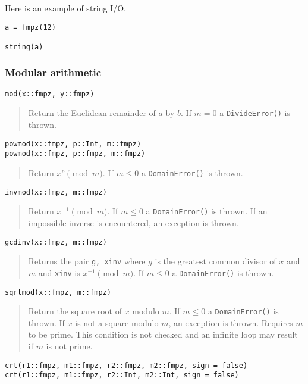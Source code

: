 \documentclass[a4paper,10pt]{article}
\newcommand{\code}{\lstinline}
\newcommand{\desc}[1]{\vspace{-3mm}\begin{quote}#1\end{quote}}
\begin{document}
{{Here is an example of string I/O.

\begin{lstlisting}
a = fmpz(12)

string(a)
\end{lstlisting}

\subsubsection{Modular arithmetic}

\begin{lstlisting}
mod(x::fmpz, y::fmpz)
\end{lstlisting}

\desc{Return the Euclidean remainder of $a$ by $b$. If $m = 0$ a \code{DivideError()} is thrown.}

\begin{lstlisting}
powmod(x::fmpz, p::Int, m::fmpz)
powmod(x::fmpz, p::fmpz, m::fmpz)
\end{lstlisting}

\desc{Return $x^p \pmod{m}$. If $m \leq 0$ a \code{DomainError()} is thrown.}

\begin{lstlisting}
invmod(x::fmpz, m::fmpz)
\end{lstlisting}

\desc{Return $x^{-1} \pmod{m}$. If $m \leq 0$ a \code{DomainError()} is thrown. If
an impossible inverse is encountered, an exception is thrown.}

\begin{lstlisting}
gcdinv(x::fmpz, m::fmpz)
\end{lstlisting}

\desc{Returns the pair \code{g, xinv} where $g$ is the greatest common divisor of
$x$ and $m$ and \code{xinv} is $x^{-1} \pmod{m}$. If $m \leq 0$ a 
\code{DomainError()} is thrown.}

\begin{lstlisting}
sqrtmod(x::fmpz, m::fmpz)
\end{lstlisting}

\desc{Return the square root of $x$ modulo $m$. If $m \leq 0$ a \code{DomainError()}
is thrown. If $x$ is not a square modulo $m$, an exception is thrown. Requires $m$ to
be prime. This condition is not checked and an infinite loop may result if $m$ is
not prime.}

\begin{lstlisting}
crt(r1::fmpz, m1::fmpz, r2::fmpz, m2::fmpz, sign = false)
crt(r1::fmpz, m1::fmpz, r2::Int, m2::Int, sign = false)
\end{lstlisting}

}}
\end{document}
